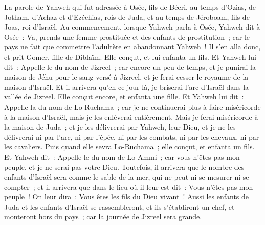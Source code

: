 \begin{multicols}{2}
\VerseOne{}La parole de Yahweh qui fut adressée à Osée, fils de Béeri, au temps d'Ozias, de Jotham, d'Achaz et d'Ezéchias, rois de Juda, et au temps de Jéroboam, fils de Joas, roi d'Israël.
Au commencement, lorsque Yahweh parla à Osée, Yahweh dit à Osée~: Va, prends une femme prostituée et des enfants de prostitution~; car le pays ne fait que commettre l'adultère en abandonnant Yahweh~!
Il s'en alla donc, et prit Gomer, fille de Diblaïm. Elle conçut, et lui enfanta un fils.
Et Yahweh lui dit~: Appelle-le du nom de Jizreel~; car encore un peu de temps, et je punirai la maison de Jéhu pour le sang versé à Jizreel, et je ferai cesser le royaume de la maison d'Israël.
Et il arrivera qu'en ce jour-là, je briserai l'arc d'Israël dans la vallée de Jizreel.
Elle conçut encore, et enfanta une fille. Et Yahweh lui dit~: Appelle-la du nom de Lo-Ruchama~; car je ne continuerai plus à faire miséricorde à la maison d'Israël, mais je les enlèverai entièrement.
Mais je ferai miséricorde à la maison de Juda~; et je les délivrerai par Yahweh, leur Dieu, et je ne les délivrerai ni par l'arc, ni par l'épée, ni par les combats, ni par les chevaux, ni par les cavaliers.
Puis quand elle sevra Lo-Ruchama~; elle conçut, et enfanta un fils.
Et Yahweh dit~: Appelle-le du nom de Lo-Ammi~; car vous n'êtes pas mon peuple, et je ne serai pas votre Dieu.
\VerseOne{}Toutefois, il arrivera que le nombre des enfants d'Israël sera comme le sable de la mer, qui ne peut ni se mesurer ni se compter~; et il arrivera que dans le lieu où il leur est dit~: Vous n'êtes pas mon peuple~! On leur dira~: Vous êtes les fils du Dieu vivant~!
Aussi les enfants de Juda et les enfants d'Israël se rassembleront, et ils s'établiront un chef, et monteront hors du pays~; car la journée de Jizreel sera grande.

\end{multicols}
